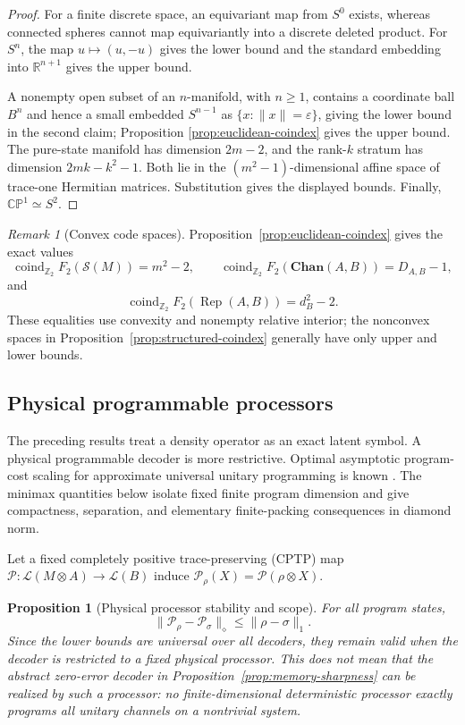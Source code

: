 \documentclass[11pt,a4paper]{article}
\theoremstyle{definition}
\theoremstyle{plain}
\newtheorem{proposition}[theorem]{Proposition}
\theoremstyle{remark}
\newtheorem{remark}[theorem]{Remark}
\newcommand{\Lin}{\mathcal L}
\newcommand{\Chan}{\mathbf{Chan}}
\newcommand{\Sstate}{\mathcal{S}}
\begin{document}
\begin{proof}
For a finite discrete space, an equivariant map from $S^0$ exists, whereas
connected spheres cannot map equivariantly into a discrete deleted product.
For $S^n$, the map $u\mapsto(u,-u)$ gives the lower bound and the standard
embedding into $\mathbb R^{n+1}$ gives the upper bound.

A nonempty open subset of an $n$-manifold, with $n\geq1$, contains a
coordinate ball $B^n$ and hence a small embedded $S^{n-1}$ as $\{x:\|x\|=\varepsilon\}$, giving the lower bound
in the second claim; Proposition
\ref{prop:euclidean-coindex} gives the upper bound. The pure-state manifold
has dimension $2m-2$, and the rank-$k$ stratum has dimension
$2mk-k^2-1$. Both lie in the $(m^2-1)$-dimensional affine space of
trace-one Hermitian matrices. Substitution gives the displayed bounds.
Finally, $\mathbb{CP}^1\simeq S^2$.
\end{proof}

\begin{remark}[Convex code spaces]
Proposition~\ref{prop:euclidean-coindex} gives the exact values
\[
\operatorname{coind}_{\mathbb Z_2}F_2(\Sstate(M))=m^2-2,
\qquad
\operatorname{coind}_{\mathbb Z_2}F_2(\Chan(A,B))=D_{A,B}-1,
\]
and
\[
\operatorname{coind}_{\mathbb Z_2}F_2(\operatorname{Rep}(A,B))=d_B^2-2.
\]
These equalities use convexity and nonempty relative interior; the nonconvex
spaces in Proposition~\ref{prop:structured-coindex} generally have only
upper and lower bounds.
\end{remark}

\subsection{Physical programmable processors}

The preceding results treat a density operator as an exact latent symbol. A
physical programmable decoder is more restrictive. Optimal asymptotic
program-cost scaling for approximate universal unitary programming is known
\cite{YangRennerChiribella2020}. The minimax quantities below isolate fixed
finite program dimension and give compactness, separation, and elementary
finite-packing consequences in diamond norm.

Let a fixed completely positive trace-preserving (CPTP) map
$\mathcal P:\Lin(M\otimes A)\to\Lin(B)$ induce
$\mathcal P_\rho(X)=\mathcal P(\rho\otimes X)$.

\begin{proposition}[Physical processor stability and scope]
\label{prop:processor}
For all program states,
\[
\|\mathcal P_\rho-\mathcal P_\sigma\|_\diamond
\leq\|\rho-\sigma\|_1.
\]
Since the lower bounds are universal over all decoders, they remain valid
when the decoder is restricted to a fixed physical processor. This does not
mean that the abstract zero-error decoder in
Proposition~\ref{prop:memory-sharpness} can be realized by such a processor:
no finite-dimensional deterministic processor exactly programs all unitary
channels on a nontrivial system.
\end{proposition}
\end{document}
